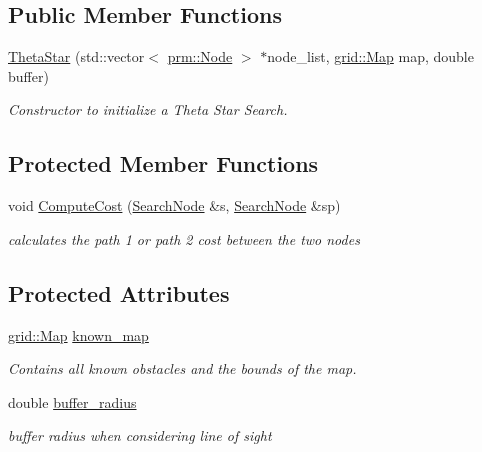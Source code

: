 \subsection*{Public Member Functions}
\begin{DoxyCompactItemize}
\item 
\hyperlink{classhsearch_1_1ThetaStar_a9c3540ce3c1e93b8053eb97e62d71145}{Theta\+Star} (std\+::vector$<$ \hyperlink{structprm_1_1Node}{prm\+::\+Node} $>$ $\ast$node\+\_\+list, \hyperlink{structgrid_1_1Map}{grid\+::\+Map} map, double buffer)
\begin{DoxyCompactList}\small\item\em Constructor to initialize a Theta Star Search. \end{DoxyCompactList}\end{DoxyCompactItemize}
\subsection*{Protected Member Functions}
\begin{DoxyCompactItemize}
\item 
void \hyperlink{classhsearch_1_1ThetaStar_a852af6d668cbb3f58079125ba5740853}{Compute\+Cost} (\hyperlink{structhsearch_1_1SearchNode}{Search\+Node} \&s, \hyperlink{structhsearch_1_1SearchNode}{Search\+Node} \&sp)
\begin{DoxyCompactList}\small\item\em calculates the path 1 or path 2 cost between the two nodes \end{DoxyCompactList}\end{DoxyCompactItemize}
\subsection*{Protected Attributes}
\begin{DoxyCompactItemize}
\item 
\mbox{\label{classhsearch_1_1ThetaStar_a90305133e71bfaa015747138383620da}} 
\hyperlink{structgrid_1_1Map}{grid\+::\+Map} \hyperlink{classhsearch_1_1ThetaStar_a90305133e71bfaa015747138383620da}{known\+\_\+map}
\begin{DoxyCompactList}\small\item\em Contains all known obstacles and the bounds of the map. \end{DoxyCompactList}\item 
\mbox{\label{classhsearch_1_1ThetaStar_aba51580af01b2cdd040b94de00046271}} 
double \hyperlink{classhsearch_1_1ThetaStar_aba51580af01b2cdd040b94de00046271}{buffer\+\_\+radius}
\begin{DoxyCompactList}\small\item\em buffer radius when considering line of sight \end{DoxyCompactList}\end{DoxyCompactItemize}


